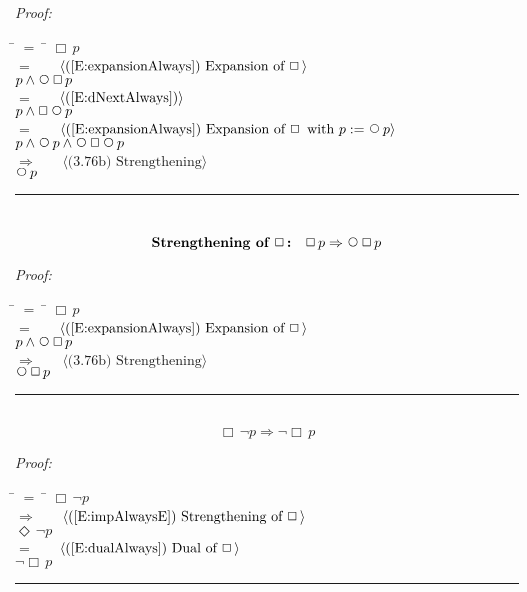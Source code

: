 \documentclass[fleqn, leqno]{article}
\newcommand{\lgap}{2pt}                             %
\newcommand{\mymathindent}{24pt}                    %
\newcommand{\Next}{\;\,\text{\raisebox{3.5pt}{\circle{6}}}}
\newcommand{\Event}{\Diamond\,}
\newcommand{\Always}{\Box\,}
\newcommand{\myqed}{\hfill\rule[-.23ex]{1.2ex}{2.0ex}}
\newcommand{\Gll} {\langle}                         %
\newcommand{\Ggg} {\rangle}                         %
\newcommand{\Hint}[1]     {\ \ \ $\Gll              \mbox{#1} \Ggg$ }   %
\begin{document}
\emph{Proof:}
\begin{tabbing}
\hspace{\mymathindent} \= $= \;$ \= \kill
  \> \>   $\Always p$\\[\lgap]
  \> $=$  \>  \Hint{(\ref{E:expansionAlways}) Expansion of $\Always$}\\[\lgap]
  \> \>   $p \land \Next\Always p$\\[\lgap]
  \> $=$  \>  \Hint{(\ref{E:dNextAlways})}\\[\lgap]
  \> \>   $p \land \Always\Next p$\\[\lgap]
  \> $=$  \>  \Hint{(\ref{E:expansionAlways}) Expansion of $\Always$ with $p := \Next p$}\\[\lgap]
  \> \>   $p \land \Next p \land \Next\Always\Next p$\\[\lgap]
  \> $\Rightarrow$  \>  \Hint{(3.76b) Strengthening}\\[\lgap]
  \> \>   $\Next p$\\[\lgap]
\end{tabbing}
\myqed\\[\lgap]


\begin{equation}\label{E:impAlwaysNA}
\textbf{Strengthening of $\Always$:}\quad \Always p \Rightarrow \Next\Always p
\end{equation}

\emph{Proof:}
\begin{tabbing}
\hspace{\mymathindent} \= $= \;$ \= \kill
  \> \>   $\Always p$\\[\lgap]
  \> $=$  \>  \Hint{(\ref{E:expansionAlways}) Expansion of $\Always$}\\[\lgap]
  \> \>   $p \land \Next\Always p$\\[\lgap]
  \> $\Rightarrow$  \>  \Hint{(3.76b) Strengthening}\\[\lgap]
  \> \>   $\Next\Always p$\\[\lgap]
\end{tabbing}
\myqed\\[\lgap]


\begin{equation}\label{E:exAlwaysNot}
\Always\lnot p \Rightarrow \lnot\Always p
\end{equation}

\emph{Proof:}
\begin{tabbing}
\hspace{\mymathindent} \= $= \;$ \= \kill
  \> \>   $\Always\lnot p$\\[\lgap]
  \> $\Rightarrow$  \>  \Hint{(\ref{E:impAlwaysE}) Strengthening of $\Always$}\\[\lgap]
  \> \>   $\Event\lnot p$\\[\lgap]
  \> $=$  \>  \Hint{(\ref{E:dualAlways}) Dual of $\Always$}\\[\lgap]
  \> \>   $\lnot\Always p$\\[\lgap]
\end{tabbing}
\myqed\\[\lgap]
\end{document}
